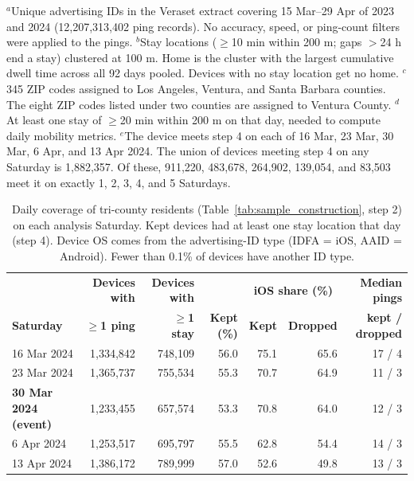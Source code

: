 \begin{table}[ht]
\vspace{4pt}
\parbox{0.95\textwidth}{\footnotesize
$^{a}$Unique advertising IDs in the Veraset extract covering 15 Mar--29 Apr of 2023 and 2024 (12,207,313,402 ping records). No accuracy, speed, or ping-count filters were applied to the pings.
$^{b}$Stay locations ($\geq$10 min within 200 m; gaps $>$24 h end a stay) clustered at 100 m. Home is the cluster with the largest cumulative dwell time across all 92 days pooled. Devices with no stay location get no home.
$^{c}$345 ZIP codes assigned to Los Angeles, Ventura, and Santa Barbara counties. The eight ZIP codes listed under two counties are assigned to Ventura County.
$^{d}$At least one stay of $\geq$20 min within 200 m on that day, needed to compute daily mobility metrics.
$^{e}$The device meets step 4 on each of 16 Mar, 23 Mar, 30 Mar, 6 Apr, and 13 Apr 2024. The union of devices meeting step 4 on any Saturday is 1,882,357. Of these, 911,220, 483,678, 264,902, 139,054, and 83,503 meet it on exactly 1, 2, 3, 4, and 5 Saturdays.}
\end{table}

\begin{table}[ht]
\centering
\small
\caption{Daily coverage of tri-county residents (Table~\ref{tab:sample_construction}, step 2) on each analysis Saturday. Kept devices had at least one stay location that day (step 4). Device OS comes from the advertising-ID type (IDFA = iOS, AAID = Android). Fewer than 0.1\% of devices have another ID type.}
\label{tab:daily_coverage}
\begin{tabular}{|l|r|r|r|r|r|r|}
\hline
\rowcolor{rowgray}
 & \textbf{Devices with} & \textbf{Devices with} & & \multicolumn{2}{c|}{\textbf{iOS share (\%)}} & \textbf{Median pings} \\
\rowcolor{rowgray}
\textbf{Saturday} & \textbf{$\geq$1 ping} & \textbf{$\geq$1 stay} & \textbf{Kept (\%)} & \textbf{Kept} & \textbf{Dropped} & \textbf{kept / dropped} \\
\hline
16 Mar 2024 & 1,334,842 & 748,109 & 56.0 & 75.1 & 65.6 & 17 / 4 \\
23 Mar 2024 & 1,365,737 & 755,534 & 55.3 & 70.7 & 64.9 & 11 / 3 \\
\textbf{30 Mar 2024 (event)} & 1,233,455 & 657,574 & 53.3 & 70.8 & 64.0 & 12 / 3 \\
6 Apr 2024 & 1,253,517 & 695,797 & 55.5 & 62.8 & 54.4 & 14 / 3 \\
13 Apr 2024 & 1,386,172 & 789,999 & 57.0 & 52.6 & 49.8 & 13 / 3 \\
\hline
\end{tabular}
\end{table}


